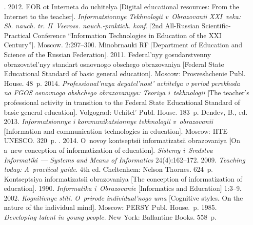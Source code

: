   \begin{multicols}{2}

\renewcommand{\bibname}{\protect\rmfamily References}



{\small\frenchspacing
 {%
 \begin{thebibliography}{99}

. 2012. EOR ot Interneta do uchitelya [Digital
educational resources: From the Internet to the teacher]. \textit{Informatsionnye Tekhnologii
v~Obrazovanii XXI~veka: Sb. nauch. tr. II~Vseross. nauch.-praktich. konf.} [2nd All-Russian
Scientific-Practical Conference ``Information Technologies in Education of the XXI  Century''].
Moscow. 2:297--300.
Minobrnauki RF
 [Department of
Education and Science of the Russian Federation]. 2011.
Federal'nyy gosudarstvenny obrazovatel'nyy standart osnovnogo obschego
obrazovaniya [Federal State
Educational Standard of basic general education].   Moscow: Prosveshchenie Publ. House. 48~p.
 2014. \textit{Professional'naya deyatel'nost' uchitelya v period perekhoda na
FGOS osnovnogo obshchego obrazovanyya: Teoriya i~tekhnologii} [The teacher's
professional activity
in transition to the Federal State Educational Standard of basic
general education]. Volgograd: Uchitel'
Publ. House. 183~p.
Dendev, B., ed.
2013. \textit{Informatsionnye i kommunikatsionnye tekhnologii v~obrazovanii}
[Information and communication technologies in education].  Moscow:
IITE \mbox{UNESCO}. 320~p.
. 2014. O~novoy
kontseptsii informatizatsii obrazovaniya [On a~new conception of informatization of education].
\textit{Sistemy i~Sredstva Informatiki}~--- \textit{Systems and Means of Informatics}
24(4):162--172.
 2009. \textit{Teaching today: A~practical guide}. 4th ed. Cheltenhem: Nelson Thornes.
624~p.
Kontseptsiya informatizatsii obrazovaniya [The conception of informatization of education].
1990. \textit{Informatika i~Obrazovanie} [Informatics and Education] 1:3--9.
 2002. \textit{Kognitivnye stili. O~prirode
individual'nogo uma} [Cognitive styles. On the nature of the individual mind]. Moscow:
PERSY Publ. House.~p.
 1985. \textit{Developing talent in young people.} New York: Ballantine Books. 558~p.


\end{thebibliography}}}
\end{multicols}
